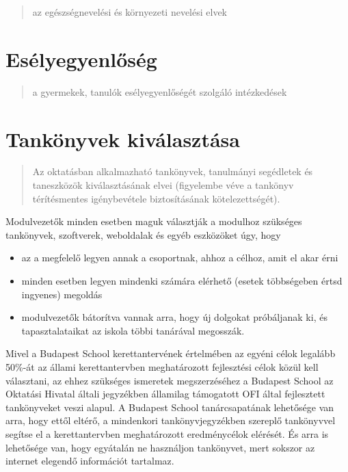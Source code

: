 \begin{quote}
      az egészségnevelési és környezeti nevelési elvek
\end{quote}
\section{Esélyegyenlőség}\label{esuxe9lyegyenlux151suxe9g}

\begin{quote}
      a gyermekek, tanulók esélyegyenlőségét szolgáló intézkedések
\end{quote}







\section{Tankönyvek kiválasztása}

\begin{quote}
      Az oktatásban alkalmazható tankönyvek, tanulmányi segédletek és
      taneszközök kiválasztásának elvei (figyelembe véve a tankönyv
      térítésmentes igénybevétele biztosításának kötelezettségét).
\end{quote}

Modulvezetők minden esetben maguk választják a modulhoz szükséges
tankönyvek, szoftverek, weboldalak és egyéb eszközöket úgy, hogy

\begin{itemize}

      \item
            az a megfelelő legyen annak a csoportnak, ahhoz a célhoz, amit el
            akar
            érni
      \item
            minden esetben legyen mindenki számára elérhető (esetek többségeben
            értsd ingyenes) megoldás
      \item
            modulvezetők bátorítva vannak arra, hogy új dolgokat próbáljanak
            ki,
            és tapasztalataikat az iskola többi tanárával megosszák.
\end{itemize}

Mivel a Budapest School kerettantervének értelmében az egyéni célok
legalább 50\%-át az állami kerettantervben meghatározott fejlesztési
célok közül kell választani, az ehhez szükséges ismeretek megszerzéséhez
a Budapest School az Oktatási Hivatal általi jegyzékben államilag
támogatott OFI által fejlesztett tankönyveket veszi alapul. A Budapest
School tanárcsapatának lehetősége van arra, hogy ettől eltérő, a
mindenkori tankönyvjegyzékben szereplő tankönyvvel segítse el a
kerettantervben meghatározott eredménycélok elérését. És arra is
lehetősége van, hogy egyátalán ne használjon tankönyvet, mert sokszor az
internet elegendő információt tartalmaz.

